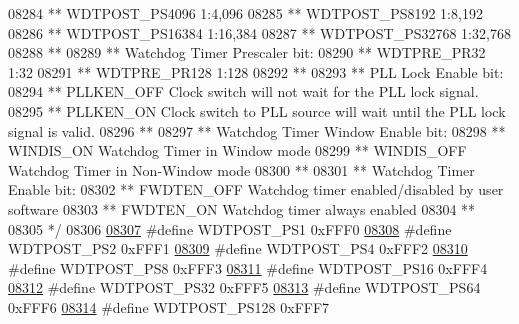 \begin{DoxyCode}
{{{{08284 \textcolor{comment}{**     WDTPOST\_PS4096       1:4,096}
08285 \textcolor{comment}{**     WDTPOST\_PS8192       1:8,192}
08286 \textcolor{comment}{**     WDTPOST\_PS16384      1:16,384}
08287 \textcolor{comment}{**     WDTPOST\_PS32768      1:32,768}
08288 \textcolor{comment}{**}
08289 \textcolor{comment}{**   Watchdog Timer Prescaler bit:}
08290 \textcolor{comment}{**     WDTPRE\_PR32          1:32}
08291 \textcolor{comment}{**     WDTPRE\_PR128         1:128}
08292 \textcolor{comment}{**}
08293 \textcolor{comment}{**   PLL Lock Enable bit:}
08294 \textcolor{comment}{**     PLLKEN\_OFF           Clock switch will not wait for the PLL lock signal.}
08295 \textcolor{comment}{**     PLLKEN\_ON            Clock switch to PLL source will wait until the PLL lock signal is valid.}
08296 \textcolor{comment}{**}
08297 \textcolor{comment}{**   Watchdog Timer Window Enable bit:}
08298 \textcolor{comment}{**     WINDIS\_ON            Watchdog Timer in Window mode}
08299 \textcolor{comment}{**     WINDIS\_OFF           Watchdog Timer in Non-Window mode}
08300 \textcolor{comment}{**}
08301 \textcolor{comment}{**   Watchdog Timer Enable bit:}
08302 \textcolor{comment}{**     FWDTEN\_OFF           Watchdog timer enabled/disabled by user software}
08303 \textcolor{comment}{**     FWDTEN\_ON            Watchdog timer always enabled}
08304 \textcolor{comment}{**}
08305 \textcolor{comment}{*/}
08306 
\hypertarget{a00015_source_l08307}{}\hyperlink{a00015_a3b907f60df72efec74b7ea17871243df}{08307} \textcolor{preprocessor}{#define WDTPOST\_PS1          0xFFF0}
\hypertarget{a00015_source_l08308}{}\hyperlink{a00015_a2ffa2fd8be792a7d45ca309eb9e94d83}{08308} \textcolor{preprocessor}{#define WDTPOST\_PS2          0xFFF1}
\hypertarget{a00015_source_l08309}{}\hyperlink{a00015_aedb9acb2d50d0d000a1f6682fdcacba0}{08309} \textcolor{preprocessor}{#define WDTPOST\_PS4          0xFFF2}
\hypertarget{a00015_source_l08310}{}\hyperlink{a00015_af4c27494e74759f053e8762756425243}{08310} \textcolor{preprocessor}{#define WDTPOST\_PS8          0xFFF3}
\hypertarget{a00015_source_l08311}{}\hyperlink{a00015_af4aab98db5d51e73e5e473deb703f7e6}{08311} \textcolor{preprocessor}{#define WDTPOST\_PS16         0xFFF4}
\hypertarget{a00015_source_l08312}{}\hyperlink{a00015_a682aecd2100f22de0b6c1e843874339f}{08312} \textcolor{preprocessor}{#define WDTPOST\_PS32         0xFFF5}
\hypertarget{a00015_source_l08313}{}\hyperlink{a00015_af7a76ceecb22cd92cd42307c8a369678}{08313} \textcolor{preprocessor}{#define WDTPOST\_PS64         0xFFF6}
\hypertarget{a00015_source_l08314}{}\hyperlink{a00015_ac9063d72654b81f2ba0ec2d6c71279db}{08314} \textcolor{preprocessor}{#define WDTPOST\_PS128        0xFFF7}
}}}}
\end{DoxyCode}

